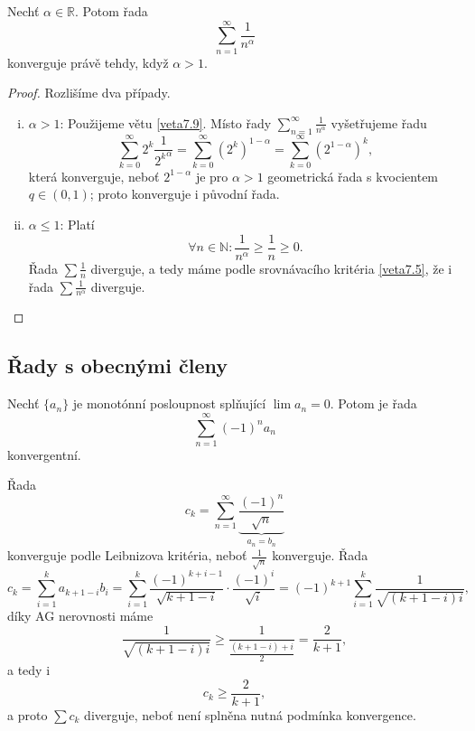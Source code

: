 \begin{veta}\label{veta7.10}
Nechť $\alpha \in \mathbb{R}$. Potom řada
\[
\sum_{n=1}^{\infty} \frac{1}{n^\alpha}
\]
konverguje právě tehdy, když $\alpha > 1$.
\end{veta}

\begin{proof}
	Rozlišíme dva případy.
	\begin{enumerate}[(i)]
		\item $\alpha > 1$: Použijeme větu \ref{veta7.9}. Místo řady $\sum_{n=1}^\infty \frac{1}{n^\alpha}$
		vyšetřujeme řadu
		$$\sum_{k=0}^\infty 2^k \frac{1}{{2^k}^\alpha} = \sum_{k=0}^\infty \left( 2^k \right )^{1-\alpha} = \sum_{k=0}^\infty \left( 2^{1-\alpha} \right )^k , $$
		která konverguje, neboť $2^{1-\alpha}$ je pro $\alpha > 1$ geometrická řada
	    s kvocientem $q\in (0,1)$; proto konverguje i původní řada.
		\item $\alpha \leq 1$: Platí
		$$
		    \forall n \in \mathbb N : \frac{1}{n^\alpha} \geq \frac{1}{n} \geq 0.
		$$
		Řada $\sum \frac{1}{n}$ diverguje, a tedy máme podle srovnávacího kritéria \ref{veta7.5},
		že i řada $\sum \frac{1}{n^\alpha}$ diverguje.\qedhere
\end{enumerate}
\end{proof}

\subsection{Řady s obecnými členy}
\begin{veta}[Leibniz] \label{veta7.11}
Nechť $\{a_n\}$ je monotónní posloupnost splňující $\lim a_n = 0$. Potom je řada
\[
\sum_{n=1}^{\infty} (-1)^n a_n
\]
konvergentní.
\end{veta}

\begin{priklad}
	Řada
	$$c_k=\sum_{n=1}^\infty \underbrace{\frac{(-1)^n}{\sqrt{n}}}_{a_n= b_n}$$ konverguje podle Leibnizova kritéria, neboť $\frac{1}{\sqrt{n}}$
	konverguje. Řada
	$$
	c_k=\sum _{i=1}^k a_{k+1-i}b_i = \sum_{i=1}^k \frac{(-1)^{k+i-1}}{\sqrt{k+1-i}}\cdot \frac{(-1)^i}{\sqrt{i}}= (-1)^{k+1} \sum_{i=1}^k \frac{1}{\sqrt{(k+1-i)i}},
	$$
	díky AG nerovnosti máme
	$$
 \frac{1}{\sqrt{(k+1-i)i}} \geq \frac{1}{\frac{(k+1-i)+i}{2}}=\frac{2}{k+1},
	$$
	a tedy i
	$$
	c_k \geq \frac{2}{k+1},
	$$
	a proto $\sum c_k$ diverguje, neboť není splněna nutná podmínka konvergence.
\end{priklad}

